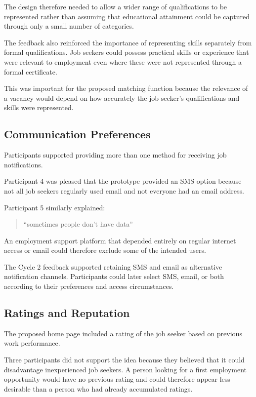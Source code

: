 The design therefore needed to allow a wider range of qualifications to be represented rather than assuming that educational attainment could be captured through only a small number of categories.

The feedback also reinforced the importance of representing skills separately from formal qualifications. Job seekers could possess practical skills or experience that were relevant to employment even where these were not represented through a formal certificate.

This was important for the proposed matching function because the relevance of a vacancy would depend on how accurately the job seeker's qualifications and skills were represented.

\subsection{Communication Preferences}

Participants supported providing more than one method for receiving job notifications.

Participant 4 was pleased that the prototype provided an SMS option because not all job seekers regularly used email and not everyone had an email address.

Participant 5 similarly explained:

\begin{quote}
``sometimes people don't have data''
\end{quote}

An employment support platform that depended entirely on regular internet access or email could therefore exclude some of the intended users.

The Cycle 2 feedback supported retaining SMS and email as alternative notification channels. Participants could later select SMS, email, or both according to their preferences and access circumstances.


\subsection{Ratings and Reputation}

The proposed home page included a rating of the job seeker based on previous work performance.

Three participants did not support the idea because they believed that it could disadvantage inexperienced job seekers. A person looking for a first employment opportunity would have no previous rating and could therefore appear less desirable than a person who had already accumulated ratings.

